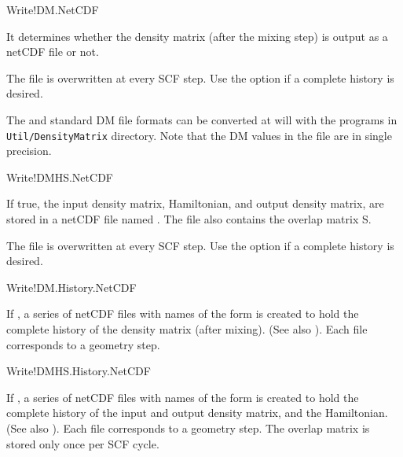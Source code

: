 \begin{fdflogicalT}{Write!DM.NetCDF}
  
  It determines whether the density matrix (after the mixing step) is
  output as a  netCDF file or not.

  The file is overwritten at every SCF step. Use the
   option if a complete history is
  desired.

  The  and standard DM file formats can be converted at
  will with the programs in \texttt{Util/DensityMatrix}
  directory. Note that the DM values in the  file are in
  single precision.

\end{fdflogicalT}

\begin{fdflogicalT}{Write!DMHS.NetCDF}

  
  If true, the input density matrix, Hamiltonian, and output density
  matrix, are stored in a netCDF file named . The file
  also contains the overlap matrix S.

  The file is overwritten at every SCF step. Use the
   option if a complete history is
  desired.

\end{fdflogicalT}


\begin{fdflogicalF}{Write!DM.History.NetCDF}

  If \fdftrue, a series of netCDF files with names of the form
   is created to hold the complete history of the
  density matrix (after mixing). (See also ). Each
  file corresponds to a geometry step.

\end{fdflogicalF}

\begin{fdflogicalF}{Write!DMHS.History.NetCDF}

  If \fdftrue, a series of netCDF files with names of the form
   is created to hold the complete history of the
  input and output density matrix, and the Hamiltonian.  (See also
  ). Each file corresponds to a geometry
  step. The overlap matrix is stored only once per SCF cycle.

\end{fdflogicalF}

